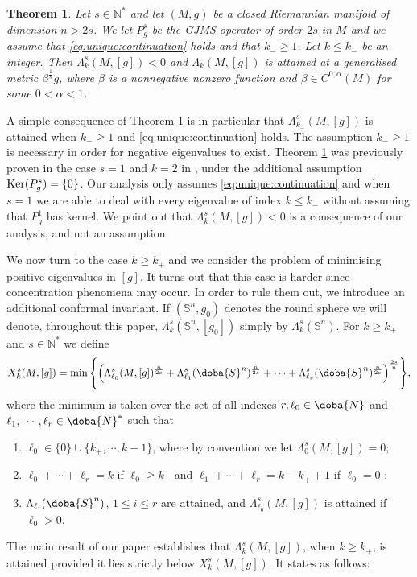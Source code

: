 \documentclass[10pt]{amsart}
\numberwithin{equation}{section}
\newcommand{\N}{\mathbb{N}}
\def\La{{\Lambda}}
\gdef\mN{\doba{N}}
\gdef\mS{\doba{S}}
\def\ker{{\mathop{\rm Ker}}}
\theoremstyle{plain}
\newtheorem{theo}{Theorem}[section]%
\theoremstyle{remark}
\begin{document}
\begin{theo} \label{theo:vp:negatives}
Let $s \in \mathbb{N}^*$ and let $(M,g)$ be a closed Riemannian manifold of dimension $n > 2s$. We let $P_g^s$ be the GJMS operator of order $2s$ in $M$ and we assume that \eqref{eq:unique:continuation} holds and that $k_- \ge 1$. Let $k \le k_{-}$ be an integer. Then  $\Lambda_k^s(M,[g])<0$ and $\Lambda_k(M,[g])$ is attained at a generalised metric $\beta^{\frac{1}{s}} g$, where $\beta$ is a nonnegative nonzero function and $\beta \in C^{0,\alpha}(M)$ for some $0< \alpha < 1$. 
\end{theo}
A simple consequence of Theorem \ref{theo:vp:negatives} is in particular that $\Lambda_{k_-}^s(M,[g])$ is attained when $k_- \ge 1$ and \eqref{eq:unique:continuation} holds. The assumption $k_- \ge 1$ is necessary in order for negative eigenvalues to exist. Theorem \ref{theo:vp:negatives} was previously proven in the case $s=1$ and $k=2$ in \cite{GurskyPerez}, under the additional assumption $\ker(P_g^s) = \{0\}$. Our analysis only assumes \eqref{eq:unique:continuation} and when $s=1$ we are able to deal with every eigenvalue of index $k \le k_-$ without assuming that $P_g^1$ has kernel. We point out that $\Lambda_k^s(M,[g])<0$ is a consequence of our analysis, and not an assumption. 


\medskip

We now turn to the case  $k \ge k_+$ and we consider the problem of minimising positive eigenvalues in $[g]$. It turns out that this case is harder since concentration phenomena may occur. In order to rule them out, we introduce an additional conformal invariant. If $(\mathbb{S}^n, g_0)$ denotes the round sphere we will denote, throughout this paper, $\Lambda_k^s(\mathbb{S}^n, [g_0])$ simply by $\Lambda_k^s(\mathbb{S}^n)$. For $k \geq k_+$ and  $s \in \N^*$ we define 
 \begin{equation} \label{definition_X}
  X_k^s(M,[g]) = \min \Bigg\{ \Big( \La_{\ell_0}^s(M,[g])^{\frac{n}{2s}} + \La_{\ell_1}^s(\mS^n)^{\frac{n}{2s}} +  \cdots + 
 \La_{\ell_r}^s(\mS^n)^{\frac{n}{2s}} \Big)^{\frac{2s}{n}} \Bigg\},
 \end{equation}
where the minimum is taken over the set of all indexes $r,\ell_0 \in \mN$ and $\ell_1,\cdots,\ell_r \in \mN^*$ such that 
\begin{enumerate}
\item  $\ell_0 \in \{ 0 \} \cup \{ k_+ ,\cdots, k - 1 \}$, where by convention we let $\Lambda_0^s(M,[g])= 0$;
 \item $\ell_0  + \cdots + \ell_r =k$ if $\ell_0 \geq k_+ $ and $\ell_1+ \cdots + \ell_r= k-k_+ +1$ if $\ell_0 =0$ ; 
 \item $\La_{\ell_i}(\mS^n)$, $1 \le i \le r$ are attained, and $\La_{\ell_0}^s(M,[g])$ is attained if $\ell_0 >0$.  
\end{enumerate}
The main result of our paper establishes that $\Lambda_k^s(M,[g])$, when $k \ge k_+$, is attained provided it lies strictly below $X_k^s(M,[g])$. It states as follows: 
\end{document}
